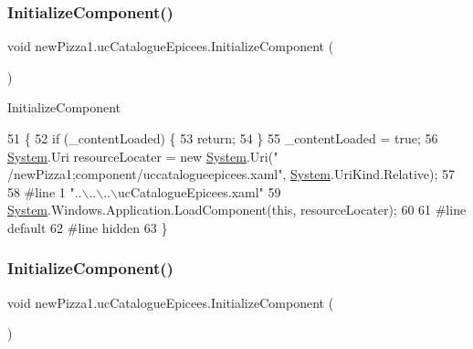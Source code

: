 \subsubsection{\texorpdfstring{Initialize\+Component()}{InitializeComponent()}\hspace{0.1cm}{\footnotesize\ttfamily [2/6]}}
{\footnotesize\ttfamily void new\+Pizza1.\+uc\+Catalogue\+Epicees.\+Initialize\+Component (\begin{DoxyParamCaption}{ }\end{DoxyParamCaption})\hspace{0.3cm}{\ttfamily [inline]}}



Initialize\+Component 


\begin{DoxyCode}
51                                           \{
52             \textcolor{keywordflow}{if} (\_contentLoaded) \{
53                 \textcolor{keywordflow}{return};
54             \}
55             \_contentLoaded = \textcolor{keyword}{true};
56             \hyperlink{namespaceSystem}{System}.Uri resourceLocater = \textcolor{keyword}{new} \hyperlink{namespaceSystem}{System}.Uri(\textcolor{stringliteral}{"
      /newPizza1;component/uccatalogueepicees.xaml"}, \hyperlink{namespaceSystem}{System}.UriKind.Relative);
57             
58 \textcolor{preprocessor}{            #line 1 "..\(\backslash\)..\(\backslash\)..\(\backslash\)ucCatalogueEpicees.xaml"}
59             \hyperlink{namespaceSystem}{System}.Windows.Application.LoadComponent(\textcolor{keyword}{this}, resourceLocater);
60             
61 \textcolor{preprocessor}{            #line default}
62 \textcolor{preprocessor}{            #line hidden}
63         \}
\end{DoxyCode}
\mbox{\label{classnewPizza1_1_1ucCatalogueEpicees_a88c609f29d5b46d57c31019576f8d7d8}} 
\subsubsection{\texorpdfstring{Initialize\+Component()}{InitializeComponent()}\hspace{0.1cm}{\footnotesize\ttfamily [3/6]}}
{\footnotesize\ttfamily void new\+Pizza1.\+uc\+Catalogue\+Epicees.\+Initialize\+Component (\begin{DoxyParamCaption}{ }\end{DoxyParamCaption})\hspace{0.3cm}{\ttfamily [inline]}}



